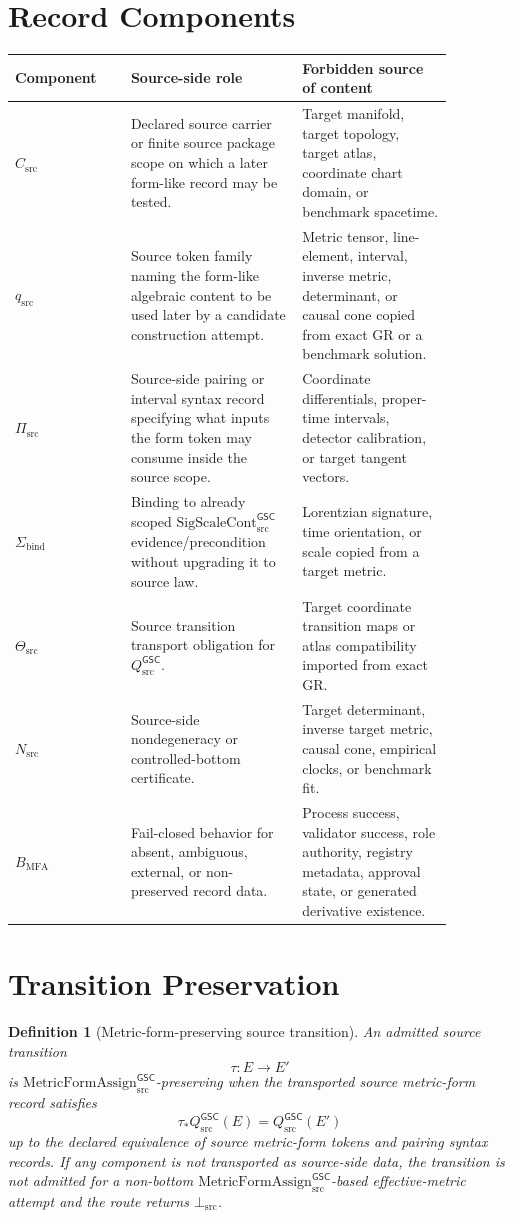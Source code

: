 \documentclass[11pt]{article}
\newcommand{\SigScaleCont}{\mathrm{SigScaleCont}_{\mathrm{src}}^{\mathsf{GSC}}}
\newcommand{\MetricFormAssign}{\mathrm{MetricFormAssign}_{\mathrm{src}}^{\mathsf{GSC}}}
\newcommand{\Qsrc}{Q_{\mathrm{src}}^{\mathsf{GSC}}}
\newcommand{\CarrierSrc}{C_{\mathrm{src}}}
\newcommand{\FormTok}{q_{\mathrm{src}}}
\newcommand{\PairTok}{\Pi_{\mathrm{src}}}
\newcommand{\TransportTok}{\Theta_{\mathrm{src}}}
\newcommand{\NondegTok}{N_{\mathrm{src}}}
\newcommand{\BottomSrc}{\bot_{\mathrm{src}}}
\newtheorem{definition}{Definition}
\begin{document}
\section{Record Components}

\begin{longtable}{p{0.23\linewidth}p{0.34\linewidth}p{0.30\linewidth}}
\toprule
Component & Source-side role & Forbidden source of content \\
\midrule
\(\CarrierSrc\) & Declared source carrier or finite source package scope on
which a later form-like record may be tested. & Target manifold, target
topology, target atlas, coordinate chart domain, or benchmark spacetime. \\
\(\FormTok\) & Source token family naming the form-like algebraic content to
be used later by a candidate construction attempt. & Metric tensor,
line-element, interval, inverse metric, determinant, or causal cone copied
from exact GR or a benchmark solution. \\
\(\PairTok\) & Source-side pairing or interval syntax record specifying what
inputs the form token may consume inside the source scope. & Coordinate
differentials, proper-time intervals, detector calibration, or target tangent
vectors. \\
\(\Sigma_{\mathrm{bind}}\) & Binding to already scoped \(\SigScaleCont\)
evidence/precondition without upgrading it to source law. & Lorentzian
signature, time orientation, or scale copied from a target metric. \\
\(\TransportTok\) & Source transition transport obligation for \(\Qsrc\). &
Target coordinate transition maps or atlas compatibility imported from exact
GR. \\
\(\NondegTok\) & Source-side nondegeneracy or controlled-bottom certificate. &
Target determinant, inverse target metric, causal cone, empirical clocks, or
benchmark fit. \\
\(B_{\mathrm{MFA}}\) & Fail-closed behavior for absent, ambiguous, external,
or non-preserved record data. & Process success, validator success, role
authority, registry metadata, approval state, or generated derivative
existence. \\
\bottomrule
\end{longtable}

\section{Transition Preservation}

\begin{definition}[Metric-form-preserving source transition]
An admitted source transition
\[
  \tau:E\to E'
\]
is \(\MetricFormAssign\)-preserving when the transported source metric-form
record satisfies
\[
  \tau_{\ast}\Qsrc(E)=\Qsrc(E')
\]
up to the declared equivalence of source metric-form tokens and pairing
syntax records. If any component is not transported as source-side data, the
transition is not admitted for a non-bottom \(\MetricFormAssign\)-based
effective-metric attempt and the route returns \(\BottomSrc\).
\end{definition}
\end{document}
